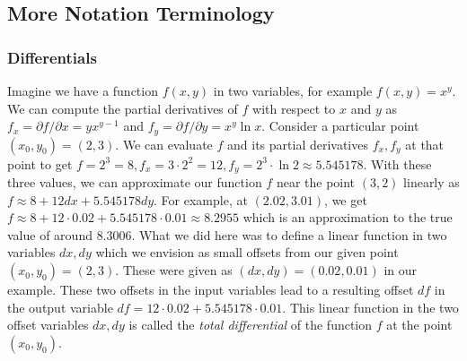 




\subsection{More Notation Terminology} 



\subsubsection{Differentials} Imagine we have a function $f(x,y)$ in two variables, for example $f(x,y) = x^y$. We can compute the partial derivatives of $f$ with respect to $x$ and $y$ as $f_x = \partial f / \partial x = y x^{y-1}$ and $f_y = \partial f / \partial y = x^y \ln x$. Consider a particular point $(x_0, y_0) = (2,3)$. We can evaluate $f$ and its partial derivatives $f_x, f_y$ at that point to get $f = 2^3 = 8, f_x = 3 \cdot 2^2 = 12, f_y = 2^3 \cdot \ln 2 \approx 5.545178$. With these three values, we can approximate our function $f$ near the point $(3,2)$ linearly as $f \approx 8 + 12 dx + 5.545178 dy$. For example, at $(2.02,3.01)$, we get $f \approx 8 + 12 \cdot 0.02 + 5.545178 \cdot 0.01 \approx 8.2955$ which is an approximation to the true value of around $8.3006$. What we did here was to define a linear function in two variables $dx,dy$ which we envision as small offsets from our given point $(x_0,y_0) = (2,3)$. These were given as $(dx,dy) = (0.02,0.01)$ in our example. These two offsets in the input variables lead to a resulting offset $df$ in the output variable $df = 12 \cdot 0.02 + 5.545178 \cdot 0.01$. This linear function in the two offset variables $dx, dy$ is called the \emph{total differential} of the function $f$ at the point $(x_0, y_0)$.

